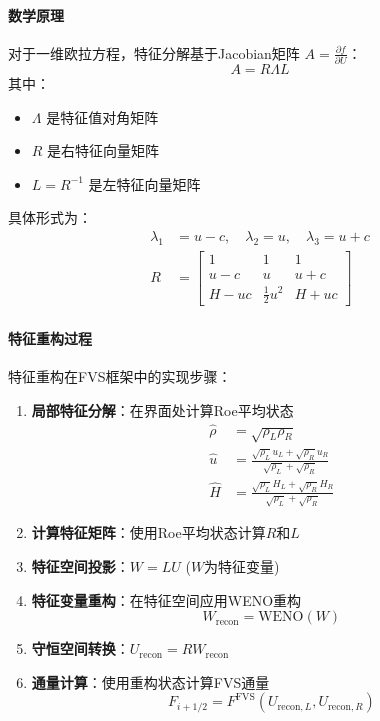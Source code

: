 \documentclass[UTF8]{ctexart}
\begin{document}
\paragraph{数学原理}
对于一维欧拉方程，特征分解基于Jacobian矩阵 $A = \frac{\partial f}{\partial U}$：
$$
A = R \Lambda L
$$
其中：
\begin{itemize}
    \item $\Lambda$ 是特征值对角矩阵
    \item $R$ 是右特征向量矩阵
    \item $L = R^{-1}$ 是左特征向量矩阵
\end{itemize}

具体形式为：
\begin{align*}
\lambda_1 &= u - c, \quad \lambda_2 = u, \quad \lambda_3 = u + c \\
R &= \begin{bmatrix}
1 & 1 & 1 \\
u-c & u & u+c \\
H - u c & \frac{1}{2}u^2 & H + u c
\end{bmatrix}
\end{align*}

\paragraph{特征重构过程}
特征重构在FVS框架中的实现步骤：
\begin{enumerate}
    \item \textbf{局部特征分解}：在界面处计算Roe平均状态
    \begin{align*}
    \hat{\rho} &= \sqrt{\rho_L \rho_R} \\
    \hat{u} &= \frac{\sqrt{\rho_L}u_L + \sqrt{\rho_R}u_R}{\sqrt{\rho_L} + \sqrt{\rho_R}} \\
    \hat{H} &= \frac{\sqrt{\rho_L}H_L + \sqrt{\rho_R}H_R}{\sqrt{\rho_L} + \sqrt{\rho_R}}
    \end{align*}
    
    \item \textbf{计算特征矩阵}：使用Roe平均状态计算$R$和$L$
    
    \item \textbf{特征空间投影}：$W = L U$ ($W$为特征变量)
    
    \item \textbf{特征变量重构}：在特征空间应用WENO重构
    $$
    W_{\text{recon}} = \text{WENO}(W)
    $$
    
    \item \textbf{守恒空间转换}：$U_{\text{recon}} = R W_{\text{recon}}$
    
    \item \textbf{通量计算}：使用重构状态计算FVS通量
    $$
    F_{i+1/2} = F^{\text{FVS}}(U_{\text{recon},L}, U_{\text{recon},R})
    $$
\end{enumerate}
\end{document}
